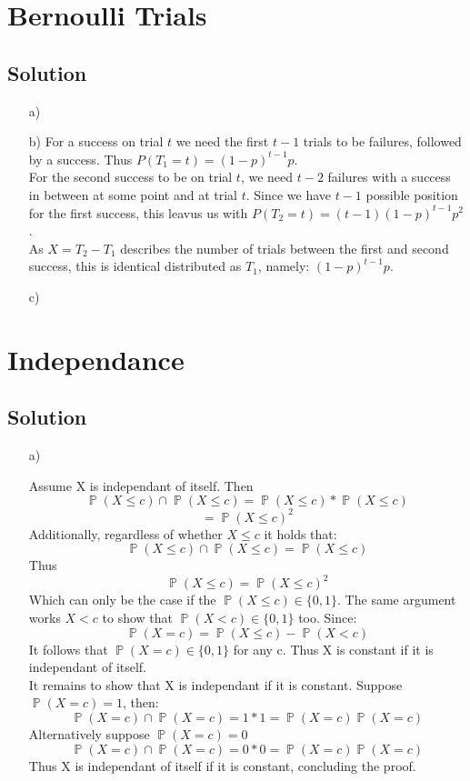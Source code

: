 \documentclass[10pt]{article}
\numberwithin{equation}{section}
\DeclareMathOperator*{\Prob}{\mathbb{P}}
\renewcommand{\Pr}{\Prob}
\begin{document}
\section*{Bernoulli Trials}
\subsection*{Solution}

\begin{enumerate}
\item[a)]{

}
\item[b)]{
    For a success on trial $t$ we need the first $t-1$ trials to be failures, followed by a success. Thus $P(T_1 = t) = (1-p)^{t-1}p$.\\
    For the second success to be on trial $t$, we need $t-2$ failures with a success in between at some point and at trial $t$. Since we have $t-1$ possible position for the first success, this leavus us with $P(T_2 = t) = (t-1)(1-p)^{t-1}p^2$.\\
    As $X = T_2 - T_1$ describes the number of trials between the first and second success, this is identical distributed as $T_1$, namely: $(1-p)^{t-1}p$.\\
}
\item[c)]{


}
\end{enumerate}

\section*{Independance}
\subsection*{Solution}
\begin{enumerate}
  \item[a)]{
      Assume X is independant of itself. Then 
      $$\Pr(X \leq c) \cap \Pr(X \leq c) = \Pr(X \leq c) * \Pr(X \leq c)$$
      $$ = \Pr(X \leq c)^2$$
      Additionally, regardless of whether $X \leq c$ it holds that:
      $$\Pr(X \leq c) \cap \Pr(X \leq c) = \Pr(X \leq c)$$
      Thus 
      $$\Pr(X \leq c) = \Pr(X \leq c)^2$$
      Which can only be the case if the $\Pr(X \leq c) \in \{0,1\}$.
      The same argument works $X < c$ to show that $\Pr(X < c) \in \{0,1\}$ too.
      Since:
      $$\Pr(X=c) =  \Pr(X \leq c)- \Pr(X < c)$$
      It follows that $\Pr(X=c) \in \{0,1\}$ for any c.
      Thus X is constant if it is independant of itself. \\
      It remains to show that X is independant if it is constant.
      Suppose $\Pr(X=c) =1$, then:
      $$\Pr(X=c) \cap \Pr(X=c) = 1 * 1 = \Pr(X=c) \Pr(X=c) $$
      Alternatively suppose $\Pr(X=c) = 0$
      $$\Pr(X=c) \cap \Pr(X=c) = 0 * 0 = \Pr(X=c) \Pr(X=c) $$
      Thus X is independant of itself if it is constant, concluding the proof.

    }
\end{enumerate}
\end{document}
